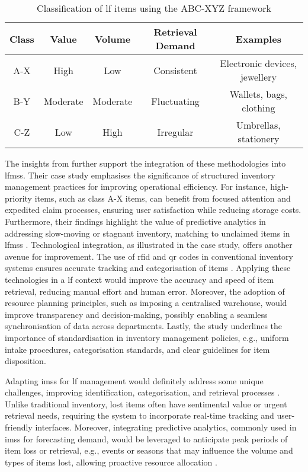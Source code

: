\begin{table}[H]
\centering
\caption{Classification of \ac{lf} items using the ABC-XYZ framework}
\begin{tabular}{|c|c|c|c|c|}
\hline
\textbf{Class} & \textbf{Value} & \textbf{Volume} & \textbf{Retrieval Demand} & \textbf{Examples} \\ 
\hline
A-X & High & Low & Consistent & Electronic devices, jewellery \\ 
\hline
B-Y & Moderate & Moderate & Fluctuating & Wallets, bags, clothing \\ 
\hline
C-Z & Low & High & Irregular & Umbrellas, stationery \\ 
\hline
\end{tabular}
\end{table}

The insights from  further support the integration of these methodologies into \acp{lfms}. Their case study emphasises the significance of structured inventory management practices for improving operational efficiency. For instance, high-priority items, such as class A-X items, can benefit from focused attention and expedited claim processes, ensuring user satisfaction while reducing storage costs. Furthermore, their findings highlight the value of predictive analytics in addressing slow-moving or stagnant inventory, matching to unclaimed items in \acp{lfms} \cite{Plinere2016}. Technological integration, as illustrated in the case study, offers another avenue for improvement. The use of \ac{rfid} and \ac{qr} codes in conventional inventory systems ensures accurate tracking and categorisation of items \cite{Plinere2016, Sohail2018}. Applying these technologies in a \ac{lf} context would improve the accuracy and speed of item retrieval, reducing manual effort and human error. Moreover, the adoption of resource planning principles, such as imposing a centralised warehouse, would improve transparency and decision-making, possibly enabling a seamless synchronisation of data across departments. Lastly, the  study underlines the importance of standardisation in inventory management policies, e.g., uniform intake procedures, categorisation standards, and clear guidelines for item disposition.

Adapting \acp{ims} for \ac{lf} management would definitely address some unique challenges, improving identification, categorisation, and retrieval processes \cite{Pauliina2024}. Unlike traditional inventory, lost items often have sentimental value or urgent retrieval needs, requiring the system to incorporate real-time tracking and user-friendly interfaces. Moreover, integrating predictive analytics, commonly used in \acp{ims} for forecasting demand, would be leveraged to anticipate peak periods of item loss or retrieval, e.g., events or seasons that may influence the volume and types of items lost, allowing proactive resource allocation \cite{Prabakaran2023}.

